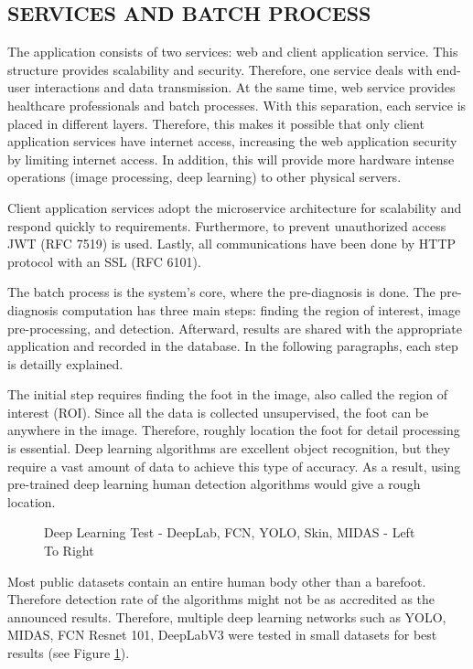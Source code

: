 \subsection{SERVICES AND BATCH PROCESS} \label{sec:StudyIServicesAndBatchProcess}
The application consists of two services: web and client application service. This structure provides scalability and security. Therefore, one service deals with end-user interactions and data transmission. At the same time, web service provides healthcare professionals and batch processes. With this separation, each service is placed in different layers. Therefore, this makes it possible that only client application services have internet access, increasing the web application security by limiting internet access.  In addition, this will provide more hardware intense operations (image processing, deep learning) to other physical servers. 

Client application services adopt the microservice architecture for scalability and respond quickly to requirements. Furthermore, to prevent unauthorized access JWT (RFC 7519) is used. Lastly, all communications have been done by HTTP protocol with an SSL (RFC 6101). 

The batch process is the system's core, where the pre-diagnosis is done. The pre-diagnosis computation has three main steps: finding the region of interest, image pre-processing, and detection. Afterward, results are shared with the appropriate application and recorded in the database. In the following paragraphs, each step is detailly explained.

The initial step requires finding the foot in the image, also called the region of interest (ROI).  Since all the data is collected unsupervised, the foot can be anywhere in the image. Therefore, roughly location the foot for detail processing is essential. Deep learning algorithms are excellent object recognition, but they require a vast amount of data to achieve this type of accuracy. As a result, using pre-trained deep learning human detection algorithms would give a rough location.

\begin{figure}[htbp]
\centering
{}
\caption{Deep Learning Test - DeepLab, FCN, YOLO, Skin, MIDAS - Left To Right}
\label{fig:DeepLearningTest}
\end{figure}

Most public datasets contain an entire human body other than a barefoot. Therefore detection rate of the algorithms might not be as accredited as the announced results. Therefore, multiple deep learning networks such as YOLO, MIDAS, FCN Resnet 101, DeepLabV3 were tested in small datasets for best results (see Figure \ref{fig:DeepLearningTest}).

